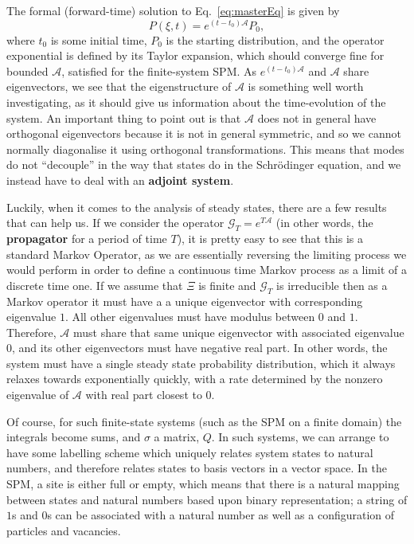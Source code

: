 The formal (forward-time) solution to Eq.~\ref{eq:masterEq} is given by
\begin{equation} \label{eqn:formalSoln}
 P(\xi, t) = e^{(t-t_0)\mathcal{A}}P_0,
\end{equation}
where $t_0$ is some initial time, $P_0$ is the starting distribution, and the operator
exponential is defined by its Taylor expansion, which should converge fine for bounded
$\mathcal{A}$, satisfied for the finite-system SPM. As 
$e^{(t-t_0)\mathcal{A}}$ and $\mathcal{A}$ share eigenvectors, we see that the
eigenstructure of $\mathcal{A}$ is something well worth investigating, as it should
give us information about the time-evolution of the system. An important thing to point
out is that $\mathcal{A}$ does not in general have orthogonal eigenvectors because it is
not in general symmetric,
and so we cannot normally diagonalise it using orthogonal transformations. This means that modes do not ``decouple'' in the way that states do in the 
Schr\"{o}dinger equation, and we instead have to deal with an \textbf{adjoint system}.

Luckily, when it comes to the analysis of steady states, there are a few results that
can help us. If we consider the operator $\mathcal{G}_T = e^{T\mathcal{A}}$ (in other words, the 
\textbf{propagator} for a period of time $T$), it is pretty easy to see that this is
a standard Markov Operator, as we are essentially reversing the limiting process
we would perform in order to define a continuous time Markov process as a limit of
a discrete time one. If we assume that $\Xi$ is finite and $\mathcal{G}_T$ is irreducible then as
a Markov operator it must have a  a unique eigenvector with corresponding eigenvalue $1$.
All other eigenvalues must have modulus between $0$ and $1$. Therefore, $\mathcal{A}$
must share that same unique eigenvector with associated eigenvalue $0$, and its other
eigenvectors must have negative real part. In other words, the system must have a single
steady state probability distribution, which it always relaxes towards exponentially
quickly, with a rate determined by the nonzero eigenvalue of $\mathcal{A}$ with real
part closest to $0$.

Of course, for such finite-state systems (such as the SPM on a finite domain) the integrals become sums, and $\sigma$ a matrix, $Q$. In such systems, we can arrange to have some labelling scheme which uniquely relates system states to natural numbers, and therefore
relates states to basis vectors in a vector space. In the SPM, a site is either full or empty, which means that there is a natural mapping between states and natural numbers based upon binary representation;
a string of $1$s and $0$s can be associated with a natural number as well as a configuration of particles and vacancies.


